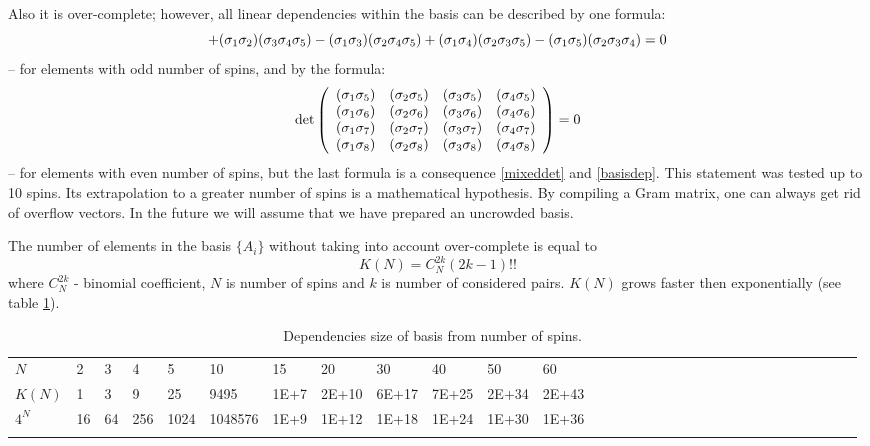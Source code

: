 \documentclass[a4paper]{jpconf}
\renewcommand\[{\begin{equation}}
\renewcommand\]{\end{equation}}
\begin{document}
Also it is over-complete; however, all linear dependencies within the basis can be described by one formula:
\[{\rm{ + (}}{{\bf{\sigma }}_1}{{\bf{\sigma }}_2}{\rm{)(}}{{\bf{\sigma }}_3}{{\bf{\sigma }}_4}{{\bf{\sigma }}_5}{\rm{) - (}}{{\bf{\sigma }}_1}{{\bf{\sigma }}_3}{\rm{)(}}{{\bf{\sigma }}_2}{{\bf{\sigma }}_4}{{\bf{\sigma }}_5}{\rm{)}} + {\rm{(}}{{\bf{\sigma }}_1}{{\bf{\sigma }}_4}{\rm{)(}}{{\bf{\sigma }}_2}{{\bf{\sigma }}_3}{{\bf{\sigma }}_5}{\rm{) - (}}{{\bf{\sigma }}_1}{{\bf{\sigma }}_5}{\rm{)(}}{{\bf{\sigma }}_2}{{\bf{\sigma }}_3}{{\bf{\sigma }}_4}{\rm{)}} = 0
\label{basisdep}
\]
-- for elements with odd number of spins, and by the formula:
\[\det \left( {\begin{array}{*{20}{c}}
	{{\rm{(}}{{\bf{\sigma }}_1}{{\bf{\sigma }}_5}{\rm{)}}}&{{\rm{(}}{{\bf{\sigma }}_2}{{\bf{\sigma }}_5}{\rm{)}}}&{{\rm{(}}{{\bf{\sigma }}_3}{{\bf{\sigma }}_5}{\rm{)}}}&{{\rm{(}}{{\bf{\sigma }}_4}{{\bf{\sigma }}_5}{\rm{)}}}\\
	{{\rm{(}}{{\bf{\sigma }}_1}{{\bf{\sigma }}_6}{\rm{)}}}&{{\rm{(}}{{\bf{\sigma }}_2}{{\bf{\sigma }}_6}{\rm{)}}}&{{\rm{(}}{{\bf{\sigma }}_3}{{\bf{\sigma }}_6}{\rm{)}}}&{{\rm{(}}{{\bf{\sigma }}_4}{{\bf{\sigma }}_6}{\rm{)}}}\\
	{{\rm{(}}{{\bf{\sigma }}_1}{{\bf{\sigma }}_7}{\rm{)}}}&{{\rm{(}}{{\bf{\sigma }}_2}{{\bf{\sigma }}_7}{\rm{)}}}&{{\rm{(}}{{\bf{\sigma }}_3}{{\bf{\sigma }}_7}{\rm{)}}}&{{\rm{(}}{{\bf{\sigma }}_4}{{\bf{\sigma }}_7}{\rm{)}}}\\
	{{\rm{(}}{{\bf{\sigma }}_1}{{\bf{\sigma }}_8}{\rm{)}}}&{{\rm{(}}{{\bf{\sigma }}_2}{{\bf{\sigma }}_8}{\rm{)}}}&{{\rm{(}}{{\bf{\sigma }}_3}{{\bf{\sigma }}_8}{\rm{)}}}&{{\rm{(}}{{\bf{\sigma }}_4}{{\bf{\sigma }}_8}{\rm{)}}}
	\end{array}} \right) = 0\]
-- for elements with even number of spins, but the last formula is a consequence \eqref{mixeddet} and \eqref{basisdep}.
This statement was tested up to 10 spins. Its extrapolation to a greater number of spins is a mathematical hypothesis.
By compiling a Gram matrix, one can always get rid of overflow vectors. In the future we will assume that we have prepared an uncrowded basis.

The number of elements in the basis $\{A_i\}$ without taking into account over-complete is equal to
\[K(N)=C_N^{2k}(2k-1)!!\]
where $C_N^{2k}$ - binomial coefficient, $N$ is number of spins and $k$ is number of considered pairs.
$K(N)$ grows faster then exponentially (see table \ref{KN}).

\begin{table}
	\caption{\label{KN}Dependencies size of basis from number of spins.}
	\begin{center}
		\begin{tabular}{lllllllllllllllllllllllllllllll}
			\br
			$N$&2 &3 &4 &5 &10 &15 &20 &30 &40 &50 &60 \\
			\mr
			$K(N)$&1 &3 &9 &25 &9495 &1E+7 &2E+10 &6E+17 &7E+25 &2E+34 &2E+43 \\
			$4^N$&16&64&256&1024&1048576&1E+9&1E+12&1E+18&1E+24&1E+30&1E+36\\
			\br
		\end{tabular}
	\end{center}
\end{table}
\end{document}
